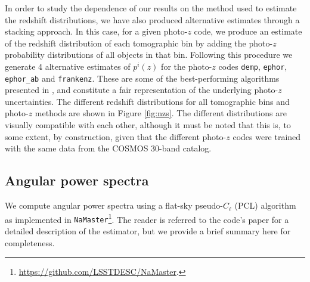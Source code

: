 \documentclass[a4paper,11pt]{article}
\begin{document}
    In order to study the dependence of our results on the method used to estimate the redshift distributions, we have also produced alternative estimates through a stacking approach. In this case, for a given photo-$z$ code, we produce an estimate of the redshift distribution of each tomographic bin by adding the photo-$z$ probability distributions of all objects in that bin. Following this procedure we generate 4 alternative estimates of $p^i(z)$ for the photo-$z$ codes {\tt demp}, {\tt ephor}, {\tt ephor\_ab} and {\tt frankenz}. These are some of the best-performing algorithms presented in \cite{2018PASJ...70S...9T}, and constitute a fair representation of the underlying photo-$z$ uncertainties. The different redshift distributions for all tomographic bins and photo-$z$ methods are shown in Figure \ref{fig:nzs}. The different distributions are visually compatible with each other, although it must be noted that this is, to some extent, by construction, given that the different photo-$z$ codes were trained with the same data from the COSMOS 30-band catalog.

  \subsection{Angular power spectra}\label{ssec:methods.cell}
    We compute angular power spectra using a flat-sky pseudo-$C_\ell$ (PCL) algorithm \citep{2002ApJ...567....2H} as implemented in {\tt NaMaster}\footnote{\url{https://github.com/LSSTDESC/NaMaster}.}. The reader is referred to the code's paper \cite{2019MNRAS.484.4127A} for a detailed description of the estimator, but we provide a brief summary here for completeness.
    
\end{document}
